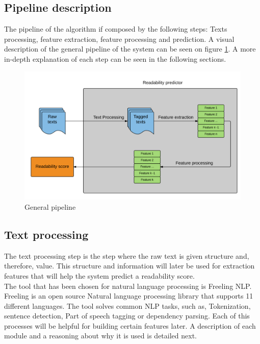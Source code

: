 \documentclass[12pt]{article}
\begin{document}
\subsection{Pipeline description}
The pipeline of the algorithm if composed by the following steps: Texts processing, feature extraction, feature processing and prediction. A visual description of the general pipeline of the system can be seen on figure \ref{fig:pipeline}.  A more in-depth explanation of each step can be seen in the following sections.

\begin{figure}[h]
\includegraphics[width=\textwidth]{pipeline}
\caption{General pipeline}
\label{fig:pipeline}
\end{figure}

\subsection{Text processing}

The text processing step is the step where the raw text is given structure and, therefore, value. This structure and information will later be used for extraction features that will help the system predict a readability score.\\

The tool that has been chosen for natural language processing is Freeling NLP\cite{freelingNLP}. Freeling is an open source Natural language processing library that supports 11 different languages. The tool solves common NLP tasks, such as, Tokenization, sentence detection, Part of speech tagging or dependency parsing. Each of this processes will be helpful for building certain features later. A description of each module and a reasoning about why it is used is detailed next.\\
\end{document}
